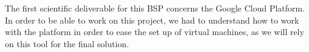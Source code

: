 The first scientific deliverable for this BSP concerns the Google
Cloud Platform. In order to be able to work on this project, we had to
understand how to work with the platform in order to ease the set up
of virtual machines, as we will rely on this tool for the final
solution.
